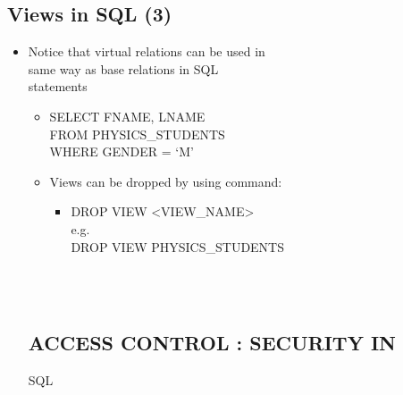 \documentclass[12pt]{article}
\begin{document}
\begin{itemize}
\begin{itemize}
\begin{itemize}
\begin{itemize}
\section{Views in SQL (3)}
\begin{itemize}
  \item Notice that virtual relations can be used in \\ 
same way as base relations in SQL \\ 
statements\\ 
\begin{itemize}
  \item SELECT FNAME, LNAME\\ 
FROM PHYSICS_STUDENTS\\ 
WHERE GENDER = ‘M’\\ 
\end{itemize}
\begin{itemize}
  \item Views can be dropped by using command:\\ 
\begin{itemize}
  \item DROP VIEW <VIEW_NAME>\\ 
e.g.\\ 
DROP VIEW PHYSICS_STUDENTS\\ 
\end{itemize}
\end{itemize}
\\ 
 \\ 
\section{ACCESS CONTROL : SECURITY IN }
SQL\\ 
\\ 
 \\ 

\end{itemize}
\end{itemize}
\end{itemize}
\end{itemize}
\end{itemize}
\end{document}
